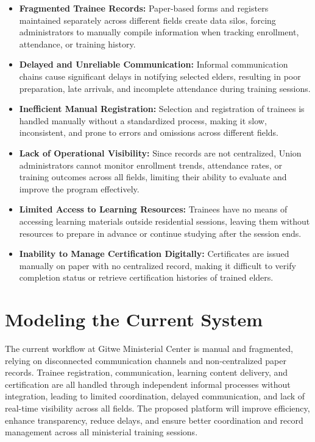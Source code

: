 \documentclass[12pt]{report}
\begin{document}
\begin{itemize}
    \item \textbf{Fragmented Trainee Records:} Paper-based forms and registers maintained separately across different fields create data silos, forcing administrators to manually compile information when tracking enrollment, attendance, or training history.
    \item \textbf{Delayed and Unreliable Communication:} Informal communication chains cause significant delays in notifying selected elders, resulting in poor preparation, late arrivals, and incomplete attendance during training sessions.
    \item \textbf{Inefficient Manual Registration:} Selection and registration of trainees is handled manually without a standardized process, making it slow, inconsistent, and prone to errors and omissions across different fields.
    \item \textbf{Lack of Operational Visibility:} Since records are not centralized, Union administrators cannot monitor enrollment trends, attendance rates, or training outcomes across all fields, limiting their ability to evaluate and improve the program effectively.
    \item \textbf{Limited Access to Learning Resources:} Trainees have no means of accessing learning materials outside residential sessions, leaving them without resources to prepare in advance or continue studying after the session ends.
    \item \textbf{Inability to Manage Certification Digitally:} Certificates are issued manually on paper with no centralized record, making it difficult to verify completion status or retrieve certification histories of trained elders.
\end{itemize}

\section{Modeling the Current System}
The current workflow at Gitwe Ministerial Center is manual and fragmented, relying on disconnected communication channels and non-centralized paper records. Trainee registration, communication, learning content delivery, and certification are all handled through independent informal processes without integration, leading to limited coordination, delayed communication, and lack of real-time visibility across all fields. The proposed platform will improve efficiency, enhance transparency, reduce delays, and ensure better coordination and record management across all ministerial training sessions.
\end{document}
